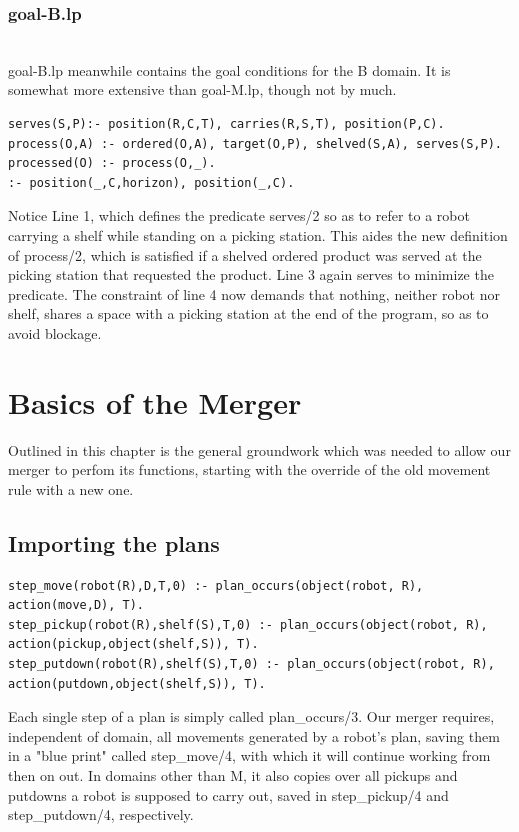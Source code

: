 \documentclass{llncs}
\begin{document}
\subsubsection{goal-B.lp}\hfill\\
goal-B.lp meanwhile contains the goal conditions for the B domain. It is somewhat more extensive than goal-M.lp, though not by much.
\begin{lstlisting}[basicstyle=\fontsize{9}{11}\selectfont\ttfamily,frame=single,breaklines=true]
serves(S,P):- position(R,C,T), carries(R,S,T), position(P,C).
process(O,A) :- ordered(O,A), target(O,P), shelved(S,A), serves(S,P).
processed(O) :- process(O,_).
:- position(_,C,horizon), position(_,C).
\end{lstlisting}
Notice Line 1, which defines the predicate serves/2 so as to refer to a robot carrying a shelf while standing on a picking station. This aides the new definition of process/2, which is satisfied if a shelved ordered product was served at the picking station that requested the product. Line 3 again serves to minimize the predicate. The constraint of line 4 now demands that nothing, neither robot nor shelf, shares a space with a picking station at the end of the program, so as to avoid blockage.\newpage


\section{Basics of the Merger}

Outlined in this chapter is the general groundwork which was needed to allow our merger to perfom its functions, starting with the override of the old movement rule with a new one.
\subsection{Importing the plans}
\begin{lstlisting}[basicstyle=\fontsize{9}{11}\selectfont\ttfamily,frame=single,breaklines=true]
step_move(robot(R),D,T,0) :- plan_occurs(object(robot, R), action(move,D), T).
step_pickup(robot(R),shelf(S),T,0) :- plan_occurs(object(robot, R), action(pickup,object(shelf,S)), T).
step_putdown(robot(R),shelf(S),T,0) :- plan_occurs(object(robot, R), action(putdown,object(shelf,S)), T).
\end{lstlisting}
Each single step of a plan is simply called plan\_occurs/3. Our merger requires, independent of domain, all movements generated by a robot's plan, saving them in a "blue print" called step\_move/4, with which it will continue working from then on out. In domains other than M, it also copies over all pickups and putdowns a robot is supposed to carry out, saved in step\_pickup/4 and step\_putdown/4, respectively.\newline
\end{document}
